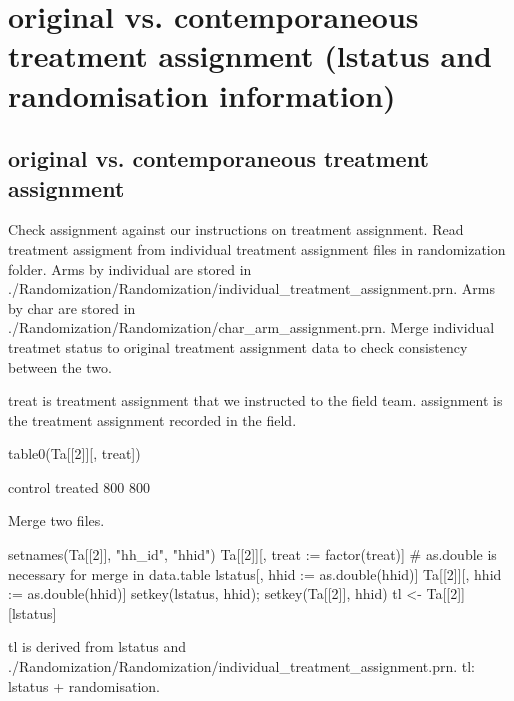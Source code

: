 \section{original vs. contemporaneous treatment assignment (lstatus and randomisation information)}

\subsection{original vs. contemporaneous treatment assignment}



	Check \textsf{assignment} against our instructions on treatment assignment. Read treatment assigment from individual treatment assignment files in randomization folder. Arms by individual are stored in \textsf{\footnotesize./Randomization/Randomization/individual\_treatment\_assignment.prn}. Arms by char are stored in \textsf{\footnotesize./Randomization/Randomization/char\_arm\_assignment.prn}. Merge individual treatmet status to original treatment assignment data to check consistency between the two.
\begin{Schunk}
\end{Schunk}
\textsf{treat} is treatment assignment that we instructed to the field team. \textsf{assignment} is the treatment assignment recorded in the field.
\begin{Schunk}
\begin{Sinput}
table0(Ta[[2]][, treat])
\end{Sinput}
\begin{Soutput}

control treated 
    800     800 
\end{Soutput}
\end{Schunk}
Merge two files.
\begin{Schunk}
\begin{Sinput}
setnames(Ta[[2]], "hh_id", "hhid")
Ta[[2]][, treat := factor(treat)]
# as.double is necessary for merge in data.table
lstatus[, hhid := as.double(hhid)]
Ta[[2]][, hhid := as.double(hhid)]
setkey(lstatus, hhid); setkey(Ta[[2]], hhid)
tl <- Ta[[2]][lstatus]
\end{Sinput}
\end{Schunk}
\textsf{tl} is derived from \textsf{lstatus} and \textsf{\footnotesize./Randomization/Randomization/individual\_treatment\_assignment.prn}.
\textsf{tl: lstatus + randomisation}.

